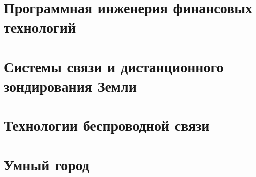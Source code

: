 \chapter{Программная инженерия финансовых технологий}


\chapter{Системы связи и дистанционного зондирования Земли}


\chapter{Технологии беспроводной связи}


\chapter{Умный город}

